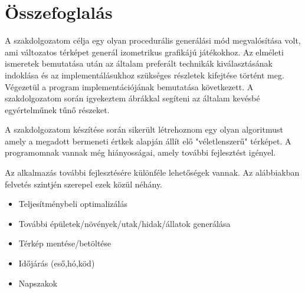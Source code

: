 \chapter{Összefoglalás}

A szakdolgozatom célja egy olyan procedurális generálási mód megvalósítása volt, ami változatos térképet generál izometrikus grafikájú játékokhoz. Az elméleti ismeretek bemutatása után az általam preferált technikák kiválasztásának indoklása és az implementálásukhoz szükséges részletek kifejtése történt meg. Végezetül a program implementációjának bemutatása következett. A szakdolgozatom során igyekeztem ábrákkal segíteni az általam kevésbé egyértelműnek tűnő részeket. 

\bigskip

A szakdolgozatom készítése során sikerült létrehoznom egy olyan algoritmust amely a megadott bermeneti értkek alapján állít elő "véletlenszerű" térképet. A programomnak vannak még hiányosságai, amely további fejlesztést igényel.

\bigskip

Az alkalmazás további fejlesztésére különféle lehetőségek vannak. Az alábbiakban felvetés szintjén szerepel ezek közül néhány.
\begin{itemize}
\item Teljesítménybeli optimalizálás
\item További épületek/növények/utak/hidak/állatok generálása
\item Térkép mentése/betöltése
\item Időjárás (eső,hó,köd)
\item Napszakok
\end{itemize}
